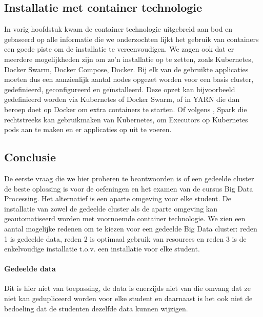\subsection{Installatie met container technologie}
In vorig hoofdstuk kwam de container technologie uitgebreid aan bod en gebaseerd op alle informatie die we onderzochten lijkt het gebruik van containers een goede piste om de installatie te vereenvoudigen.
\newline
We zagen ook dat er meerdere mogelijkheden zijn om zo'n installatie op te zetten, zoals Kubernetes, Docker Swarm, Docker Compose, Docker.
\newline
Bij elk van de gebruikte applicaties moeten dus een aanzienlijk aantal nodes opgezet worden voor een basis cluster, gedefinieerd, geconfigureerd en geïnstalleerd.
\newline
Deze opzet kan bijvoorbeeld gedefinieerd worden via Kubernetes of Docker Swarm, of in YARN die dan beroep doet op Docker om extra containers te starten. Of volgens \textcite{Spark2023d}, Spark die rechtstreeks kan gebruikmaken van Kubernetes, om Executors op Kubernetes pods aan te maken en er applicaties op uit te voeren.


\subsection{Conclusie}
De eerste vraag die we hier proberen te beantwoorden is of een gedeelde cluster de beste oplossing is voor de oefeningen en het examen van de cursus Big Data Processing. Het alternatief is een aparte omgeving voor elke student.
\newline
De installatie van zowel de gedeelde cluster als de aparte omgeving kan geautomatiseerd worden met voornoemde container technologie.
\newline
We zien een aantal mogelijke redenen om te kiezen voor een gedeelde Big Data cluster: reden 1 is gedeelde data, reden 2 is optimaal gebruik van resources en reden 3 is de enkelvoudige installatie t.o.v. een installatie voor elke student.

\paragraph{Gedeelde data}
Dit is hier niet van toepassing, de data is enerzijds niet van die omvang dat ze niet kan gedupliceerd worden voor elke student en daarnaast is het ook niet de bedoeling dat de studenten dezelfde data kunnen wijzigen.

